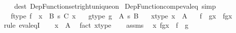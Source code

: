\begin{isabellebody}
\ \ \ \ dest{\isacharcolon}{\kern0pt}\ Dep{\isacharunderscore}{\kern0pt}Function{\isacharunderscore}{\kern0pt}set{\isacharunderscore}{\kern0pt}right{\isacharunderscore}{\kern0pt}unique{\isacharunderscore}{\kern0pt}on{\isacharparenright}{\kern0pt}\isanewline
{}\isamarkupfalse%
%
\endisatagproof
{\isafoldproof}%
%
\isadelimproof
\isanewline
%
\endisadelimproof
\isanewline
{}\isamarkupfalse%
\ Dep{\isacharunderscore}{\kern0pt}Function{\isacharunderscore}{\kern0pt}comp{\isacharunderscore}{\kern0pt}eval{\isacharunderscore}{\kern0pt}eq\ {\isacharbrackleft}{\kern0pt}simp{\isacharbrackright}{\kern0pt}{\isacharcolon}{\kern0pt}\isanewline
\ \ \ f{\isacharunderscore}{\kern0pt}type{\isacharcolon}{\kern0pt}\ {\isachardoublequoteopen}f\ {\isacharcolon}{\kern0pt}\ {\isacharparenleft}{\kern0pt}x\ {\isacharcolon}{\kern0pt}\ B{\isacharparenright}{\kern0pt}\ {\isasymrightarrow}s\ {\isacharparenleft}{\kern0pt}C\ x{\isacharparenright}{\kern0pt}{\isachardoublequoteclose}\isanewline
\ \ \ g{\isacharunderscore}{\kern0pt}type{\isacharcolon}{\kern0pt}\ {\isachardoublequoteopen}g\ {\isacharcolon}{\kern0pt}\ A\ {\isasymrightarrow}s\ B{\isachardoublequoteclose}\isanewline
\ \ \ x{\isacharunderscore}{\kern0pt}type{\isacharcolon}{\kern0pt}\ {\isachardoublequoteopen}x\ {\isacharcolon}{\kern0pt}\ A{\isachardoublequoteclose}\isanewline
\ \ \ {\isachardoublequoteopen}{\isacharparenleft}{\kern0pt}f\ {\isasymcirc}\ g{\isacharparenright}{\kern0pt}{\isacharbackquote}{\kern0pt}x\ {\isacharequal}{\kern0pt}\ f{\isacharbackquote}{\kern0pt}{\isacharparenleft}{\kern0pt}g{\isacharbackquote}{\kern0pt}x{\isacharparenright}{\kern0pt}{\isachardoublequoteclose}\isanewline
%
\isadelimproof
%
\endisadelimproof
%
\isatagproof
{}\isamarkupfalse%
\ {\isacharparenleft}{\kern0pt}rule\ eval{\isacharunderscore}{\kern0pt}eqI{\isacharparenright}{\kern0pt}\isanewline
\ \ \isamarkupfalse%
\ {\isachardoublequoteopen}x\ {\isacharcolon}{\kern0pt}\ A{\isachardoublequoteclose}\ \isamarkupfalse%
\ {\isacharparenleft}{\kern0pt}fact\ x{\isacharunderscore}{\kern0pt}type{\isacharparenright}{\kern0pt}\isanewline
\ \ \isamarkupfalse%
\ assms\ \isamarkupfalse%
\ {\isachardoublequoteopen}{\isasymlangle}x{\isacharcomma}{\kern0pt}\ f{\isacharbackquote}{\kern0pt}{\isacharparenleft}{\kern0pt}g{\isacharbackquote}{\kern0pt}x{\isacharparenright}{\kern0pt}{\isasymrangle}\ {\isasymin}\ f\ {\isasymcirc}\ g{\isachardoublequoteclose}\ \isamarkupfalse%

\end{isabellebody}
